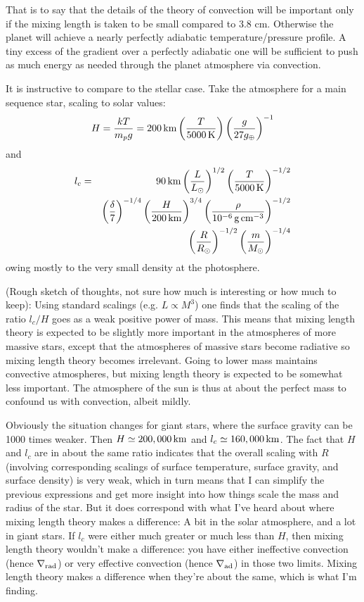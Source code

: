 \documentclass{emulateapj}
\newcommand{\nablaAd}{\nabla_{\rm ad}}
\newcommand{\nablaRad}{\nabla_{\rm rad}}
\newcommand{\scale}[2]{\left(\frac{#1}{#2}\right)}
\newcommand{\unit}[1]{\,\hbox{#1}}
\begin{document}
That is to say that the details of the theory of convection will be
important only if the mixing length is taken to be small compared to
3.8 cm.  Otherwise the planet will achieve a nearly perfectly
adiabatic temperature/pressure profile.  A tiny excess of the gradient
over a perfectly adiabatic one will be sufficient to push as much
energy as needed through the planet atmosphere via convection.

It is instructive to compare to the stellar case.  Take the atmosphere
for a main sequence star, scaling to solar values:
\begin{equation}
  H = \frac{kT}{m_p g} 
  = 200 \unit {km} 
  \scale{T}{5000 \unit K}
  \scale{g}{27 g_\oplus}^{-1}
\end{equation}
and 
\begin{eqnarray}
l_c &=& 90 \unit{km} 
  \scale{L}{L_\odot}^{1/2}
  \scale{T}{5000 \unit{K}}^{-1/2}
\nonumber \\
& &
  \scale{\delta}{7}^{-1/4} 
  \scale{H}{200 \unit{km}}^{3/4} 
  \scale{\rho}{10^{-6} \unit{g}\unit{cm}^{-3}}^{-1/2} 
\nonumber \\
& &
  \scale{R}{R_\odot}^{-1/2}
  \scale{m}{M_\odot}^{-1/4} 
\end{eqnarray}
owing mostly to the very small density at the photosphere.

(Rough sketch of thoughts, not sure how much is interesting or how
much to keep):  Using standard scalings (e.g. $L\propto M^3$) one finds
that the scaling of the ratio $l_c/H$ goes as a weak positive power of
mass.  This means that mixing length theory is expected to be slightly
more important in the atmospheres of more massive stars, except that
the atmospheres of massive stars become radiative so mixing length
theory becomes irrelevant.  Going to lower mass maintains convective
atmospheres, but mixing length theory is expected to be somewhat less
important.  The atmosphere of the sun is thus at about the perfect
mass to confound us with convection, albeit mildly.

Obviously the situation changes for giant stars, where the surface
gravity can be 1000 times weaker.  Then $H \simeq 200,000 \unit{km}$
and $l_c \simeq 160,000 \unit{km}$.  The fact that $H$ and $l_c$ are
in about the same ratio indicates that the overall scaling with $R$
(involving corresponding scalings of surface temperature, surface
gravity, and surface density) is very weak, which in turn means that I
can simplify the previous expressions and get more insight into how
things scale the mass and radius of the star.  But it does correspond
with what I've heard about where mixing length theory makes a
difference: A bit in the solar atmosphere, and a lot in giant stars.
If $l_c$ were either much greater or much less than $H$, then mixing
length theory wouldn't make a difference: you have either ineffective
convection (hence $\nablaRad$) or very effective convection (hence
$\nablaAd$) in those two limits.  Mixing length theory makes a
difference when they're about the same, which is what I'm finding.
\end{document}
